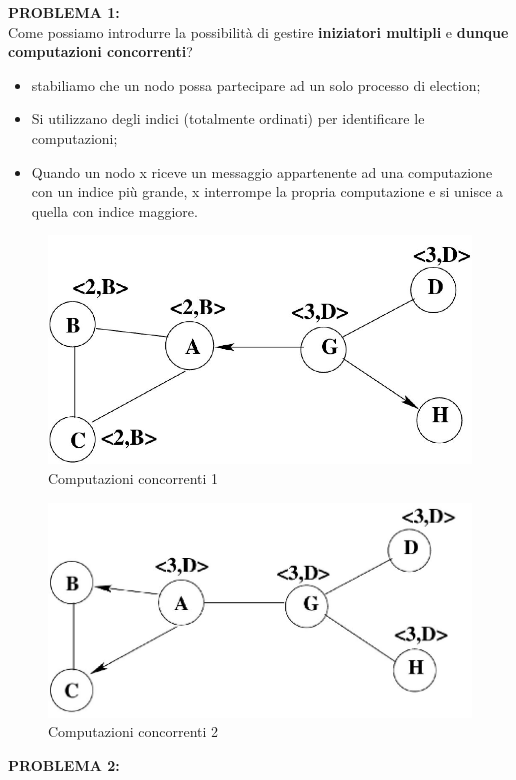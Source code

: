 \documentclass[12pt]{article}
\begin{document}
			\textbf{PROBLEMA 1:}\\
			Come possiamo introdurre la possibilità di gestire \textbf{iniziatori multipli} e \textbf{dunque computazioni concorrenti}?
			\begin{itemize}
				\item stabiliamo che un nodo possa partecipare ad un solo processo di election;
				\item Si utilizzano degli indici (totalmente ordinati) per identificare le computazioni;
				\item Quando un nodo x riceve un messaggio appartenente ad una computazione con un indice più grande, x interrompe la propria computazione e si unisce a quella con indice maggiore. 
			\end{itemize}
			\begin{figure}[h!]
				\centering
				\includegraphics[scale=0.40]{img/adex.png}
				\caption{Computazioni concorrenti 1}
			\end{figure}
			\begin{figure}[h!]
				\centering
				\includegraphics[scale=0.40]{img/adex1.png}
				\caption{Computazioni concorrenti 2}
			\end{figure}
			\textbf{PROBLEMA 2:}\\
\end{document}
